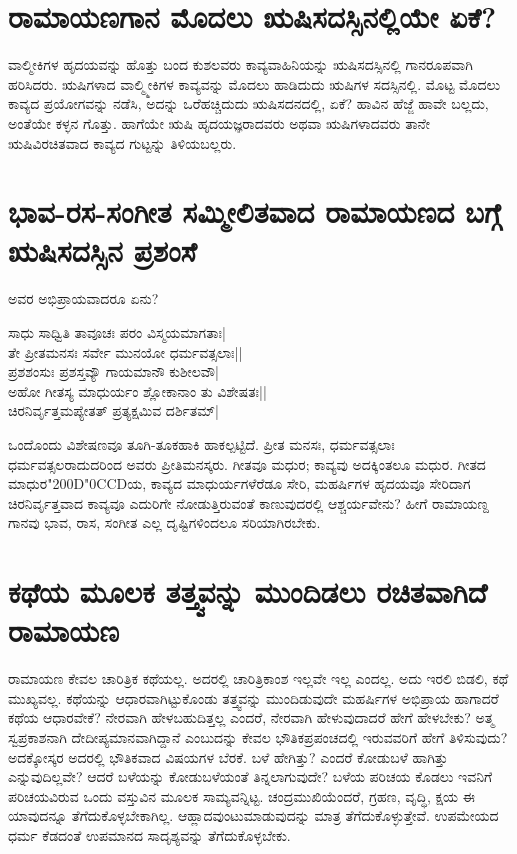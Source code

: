 \section*{ರಾಮಾಯಣಗಾನ ಮೊದಲು ಋಷಿಸದಸ್ಸಿನಲ್ಲಿಯೇ ಏಕೆ?}

ವಾಲ್ಮೀಕಿಗಳ ಹೃದಯವನ್ನು ಹೊತ್ತು ಬಂದ ಕುಶಲವರು ಕಾವ್ಯವಾಹಿನಿಯನ್ನು ಋಷಿಸದಸ್ಸಿನಲ್ಲಿ ಗಾನರೂಪವಾಗಿ ಹರಿಸಿದರು. ಋಷಿಗಳಾದ ವಾಲ್ಮ್ಮೀಕಿಗಳ ಕಾವ್ಯವನ್ನು ಮೊದಲು ಹಾಡಿದುದು ಋಷಿಗಳ ಸದಸ್ಸಿನಲ್ಲಿ. ಮೊಟ್ಟ ಮೊದಲು ಕಾವ್ಯದ ಪ್ರಯೋಗವನ್ನು ನಡೆಸಿ, ಅದನ್ನು ಒರೆಹಚ್ಚಿದುದು ಋಷಿಸದನದಲ್ಲಿ, ಏಕೆ? ಹಾವಿನ ಹೆಜ್ಜೆ ಹಾವೇ ಬಲ್ಲದು, ಅಂತೆಯೇ ಕಳ್ಳನ ಗೊತ್ತು. ಹಾಗೆಯೇ  ಋಷಿ ಹೃದಯಜ್ಞರಾದವರು ಅಥವಾ ಋಷಿಗಳಾದವರು ತಾನೇ ಋಷಿವಿರಚಿತವಾದ ಕಾವ್ಯದ ಗುಟ್ಟನ್ನು ತಿಳಿಯಬಲ್ಲರು. 

\section*{ಭಾವ-ರಸ-ಸಂಗೀತ ಸಮ್ಮೀಲಿತವಾದ ರಾಮಾಯಣದ ಬಗ್ಗೆ ಋಷಿಸದಸ್ಸಿನ ಪ್ರಶಂಸೆ}

ಅವರ ಅಭಿಪ್ರಾಯವಾದರೂ ಏನು?

\begin{shloka}
ಸಾಧು ಸಾಧ್ವಿತಿ ತಾವೂಚಃ ಪರಂ ವಿಸ್ಮಯಮಾಗತಾಃ|\\
ತೇ ಪ್ರೀತಮನಸಃ ಸರ್ವೇ ಮುನಯೋ ಧರ್ಮವತ್ಸಲಾಃ||\\
ಪ್ರಶಶಂಸುಃ ಪ್ರಶಸ್ತವ್ಯೌ ಗಾಯಮಾನೌ ಕುಶೀಲವೌ|\label{243a}\\
ಅಹೋ ಗೀತಸ್ಯ ಮಾಧುರ್ಯಂ ಶ್ಲೋಕಾನಾಂ ತು ವಿಶೇಷತಃ||\\
ಚಿರನಿರ್ವೃತ್ತಮಪ್ಯೇತತ್ ಪ್ರತ್ಯಕ್ಷಮಿವ ದರ್ಶಿತಮ್|\label{243}\\
\end{shloka}

ಒಂದೊಂದು ವಿಶೇಷಣವೂ ತೂಗಿ-ತೂಕಹಾಕಿ ಹಾಕಲ್ಪಟ್ಟಿದೆ. ಪ್ರೀತ ಮನಸಃ, ಧರ್ಮವತ್ಸಲಾಃ ಧರ್ಮವತ್ಸಲರಾದುದರಿಂದ ಅವರು ಪ್ರೀತಿಮನಸ್ಕರು. ಗೀತವೂ ಮಧುರ; ಕಾವ್ಯವು ಅದಕ್ಕಿಂತಲೂ ಮಧುರ. ಗೀತದ ಮಾಧುರ\char"200D\char"0CCDಯ,  ಕಾವ್ಯದ ಮಾಧುರ್ಯಗಳೆರೆಡೂ ಸೇರಿ, ಮಹರ್ಷಿಗಳ ಹೃದಯವೂ ಸೇರಿದಾಗ ಚಿರನಿರ್ವೃತ್ತವಾದ ಕಾವ್ಯವೂ ಎದುರಿಗೇ ನೋಡುತ್ತಿರುವಂತೆ ಕಾಣುವುದರಲ್ಲಿ ಆಶ್ಚರ್ಯವೇನು? ಹೀಗೆ ರಾಮಾಯಣ್ದ ಗಾನವು ಭಾವ, ರಾಸ, ಸಂಗೀತ ಎಲ್ಲ ದೃಷ್ಟಿಗಳಿಂದಲೂ ಸರಿಯಾಗಿರಬೇಕು. 

\section*{ಕಥೆಯ ಮೂಲಕ ತತ್ತ್ವವನ್ನು ಮುಂದಿಡಲು ರಚಿತವಾಗಿದೆ ರಾಮಾಯಣ}

ರಾಮಾಯಣ ಕೇವಲ ಚಾರಿತ್ರಿಕ ಕಥೆಯಲ್ಲ. ಅದರಲ್ಲಿ ಚಾರಿತ್ರಿಕಾಂಶ ಇಲ್ಲವೇ ಇಲ್ಲ ಎಂದಲ್ಲ. ಅದು ಇರಲಿ ಬಿಡಲಿ, ಕಥೆ ಮುಖ್ಯವಲ್ಲ. ಕಥೆಯನ್ನು ಆಧಾರವಾಗಿಟ್ಟುಕೊಂಡು ತತ್ತ್ವವನ್ನು ಮುಂದಿಡುವುದೇ ಮಹರ್ಷಿಗಳ ಅಭಿಪ್ರಾಯ ಹಾಗಾದರೆ ಕಥೆಯ ಆಧಾರವೇಕೆ? ನೇರವಾಗಿ ಹೇಳಬಹುದಿತ್ತಲ್ಲ ಎಂದರೆ, ನೇರವಾಗಿ ಹೇಳುವುದಾದರೆ ಹೇಗೆ ಹೇಳಬೇಕು? ಅತ್ಮ ಸ್ವಪ್ರಕಾಶನಾಗಿ ದೇದೀಪ್ಯಮಾನವಾಗಿದ್ದಾನೆ ಎಂಬುದನ್ನು ಕೇವಲ ಭೌತಿಕಪ್ರಪಂಚದಲ್ಲಿ ಇರುವವರಿಗೆ ಹೇಗೆ ತಿಳಿಸುವುದು? ಅದಕ್ಕೋಸ್ಕರ ಅದರಲ್ಲಿ ಭೌತಿಕವಾದ ವಿಷಯಗಳ ಬೆರಕೆ. ಬಳೆ ಹೇಗಿತ್ತು? ಎಂದರೆ ಕೋಡುಬಳೆ ಹಾಗಿತ್ತು ಎನ್ನುವುದಿಲ್ಲವೇ? ಆದರೆ ಬಳೆಯನ್ನು ಕೋಡುಬಳೆಯಂತೆ ತಿನ್ನಲಾಗುವುದೇ? ಬಳೆಯ ಪರಿಚಯ ಕೊಡಲು ಇವನಿಗೆ ಪರಿಚಯವಿರುವ ಒಂದು ವಸ್ತುವಿನ ಮೂಲಕ ಸಾಮ್ಯವನ್ನಿಟ್ಟ. ಚಂದ್ರಮುಖಿಯೆಂದರೆ, ಗ್ರಹಣ, ವೃದ್ಧಿ, ಕ್ಷಯ ಈ ಯಾವುದನ್ನೂ ತೆಗೆದುಕೊಳ್ಳಬೇಕಾಗಿಲ್ಲ. ಆಹ್ಲಾದವುಂಟುಮಾಡುವುದನ್ನು ಮಾತ್ರ ತೆಗೆದುಕೊಳ್ಳುತ್ತೇವೆ. ಉಪಮೇಯದ ಧರ್ಮ ಕೆಡದಂತೆ ಉಪಮಾನದ ಸಾದೃಶ್ಯವನ್ನು ತೆಗೆದುಕೊಳ್ಳಬೇಕು. 

